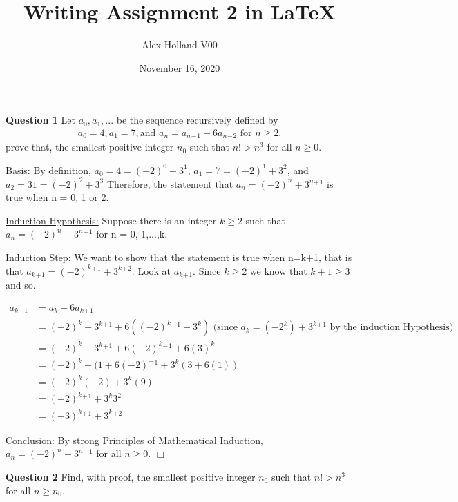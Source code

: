 \documentclass{article}
\title{Writing Assignment 2 in \LaTeX}
\author{Alex Holland V00 }
\date{November 16, 2020}
\begin{document}
\maketitle

\bigskip
{\bf Question 1} Let ${a_0},{a_1},...$ be the sequence recursively defined by\\
\begin{equation*}
\begin{split}
   {a_0}=4,{a_1}=7, \text{and } {a_n}={a_n}{_-}{_1}+6{a_n}{_-}{_2} \text{ for } n \geq 2. 
\end{split}
\end{equation*}
 prove that, the smallest positive integer ${n_0}$ such that $n!>n^3$ for all $n \geq 0$.

\bigskip
\underline{Basis:} By definition, ${a_0}=4={(-2)^0}+{3^1}$, ${a_1}=7={(-2)^1}+{3^2}$, and ${a_2}=31={(-2)^2}+{3^3}$ 
Therefore, the statement that ${a_n={(-2)^n}+{3^n}{^+}{^1}}$ is true when n = 0, 1 or 2.

\smallskip
\underline{Induction Hypothesis:} Suppose there is an integer $k \geq 2$ such that ${a_n={(-2)^n}+{3^n}{^+}{^1}}$ for n = 0, 1,...,k.

\smallskip
\underline{Induction Step:} We want to show that the statement is true when n=k+1, 
that is that ${a_k}{_+}{_1}={(-2)^k}{^+}{^1}+{3^k}{^+}{^2}$.
Look at ${a_k}{_+}{_1}$. Since $k \geq 2$ we know that $k+1 \geq 3$ and so.

\begin{equation*}
\begin{split}
     {a_k}{_+}{_1} & ={a_k}+6{a_k}{_+}{_1}\\
    & ={(-2)^k}+{3^k}{^+}{^1}+6({(-2)^k}{^-}{^1}+{3^k}) 
    \text{ (since } a_k=(-2^k)+{3^k}{^+}{^1} \text{ by the induction Hypothesis})\\
    & ={(-2)^k}+{3^k}{^+}{^1}+6{(-2)^k}{^-}{^1}+6{(3)^k}\\
    & ={(-2)^k}+(1+6{(-2)^-}{^1}+{3^k}(3+6(1))\\
    & ={(-2)^k}(-2)+{3^k}(9)\\
    & ={(-2)^k}{^+}{^1}+{3^k}{3^2}\\
    & = {(-3)^k}{^+}{^1}+{3^k}{^+}{^2}
\end{split}
\end{equation*}

\smallskip
\underline{Conclusion:} By strong Principles of Mathematical Induction, ${a_n}={(-2)^n}+{3^n}{^+}{^1}$ for all $n \geq 0$. $\Box$

\bigskip
\bigskip
{\bf Question 2}
Find, with proof, the smallest positive integer ${n_0}$ such that ${n!>n^3}$ 
for all ${n \geq {n_0}}$.
\end{document}
